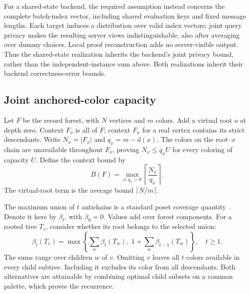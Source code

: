 For a shared-state backend, the required assumption instead concerns
the complete batch-index vector, including shared evaluation keys and
fixed message lengths. Each target induces a distribution over valid
index vectors; joint query privacy makes the resulting server views
indistinguishable, also after averaging over dummy choices. Local
proof reconstruction adds no server-visible output. Thus the shared-state
realization inherits the backend's joint privacy bound, rather than
the independent-instance sum above. Both realizations inherit their
backend correctness-error bounds.

\subsection{Joint anchored-color capacity}
\label{sec:joint-anchor-proof}
Let $F$ be the record forest, with $N$ vertices and $m$ colors. Add a
virtual root $o$ at depth zero. Context $F_o$ is all of $F$; context
$F_x$ for a real vertex contains its strict descendants. Write
$N_x=|F_x|$ and $q_x=m-d(x)$. The colors on the root--$x$ chain are
unavailable throughout $F_x$, proving $N_x\le q_x U$ for every coloring
of capacity $U$. Define the context bound by
\begin{equation}
 B(F)=\max_{x:q_x>0}\left\lceil\frac{N_x}{q_x}\right\rceil.
 \label{eq:supp-context-bound}
\end{equation}
The virtual-root term is the average bound $\lceil N/m\rceil$.

The maximum union of $t$ antichains is a standard poset coverage
quantity~\cite{antichaincoverage}. Denote it here by $\beta_t$, with
$\beta_0=0$. Values add over forest components. For a rooted tree $T_v$,
consider whether its root belongs to the selected union:
\begin{equation}
 \beta_t(T_v)=\max\left\{\sum_w\beta_t(T_w),\;
  1+\sum_w\beta_{t-1}(T_w)\right\},\quad t\ge1.
 \label{eq:compact-beta}
\end{equation}
The sums range over children $w$ of $v$. Omitting $v$ leaves all $t$
colors available in every child subtree. Including it excludes its
color from all descendants. Both alternatives are attainable by
combining optimal child subsets on a common palette, which proves
the recurrence.

